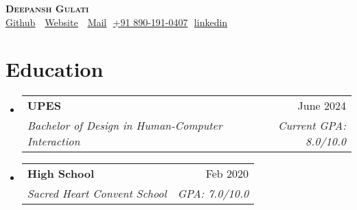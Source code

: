 \documentclass[letterpaper,11pt]{article}
\makeatletter
\newcommand{\resumeSubheading}[4]{
  \vspace{-2pt}\item
    \begin{tabular*}{0.97\textwidth}[t]{l@{\extracolsep{\fill}}r}
      \textbf{#1} & #2 \\
      \textit{\small#3} & \textit{\small #4} \\
    \end{tabular*}\vspace{-7pt}
}
\newcommand{\resumeSubHeadingListStart}{\begin{itemize}[leftmargin=0.15in, label={}]}
\newcommand{\resumeSubHeadingListEnd}{\end{itemize}}
\makeatother
\begin{document}
\begin{flushright}
  \vspace{-4pt}
\end{flushright}

\vspace{-7pt}

\begin{center}
    \textbf{\Huge \scshape Deepansh Gulati} \\ \vspace{8pt}
    \small 
    \faGithub
    \href{https://github.com/NeuralWordsmith}{\underline{Github}} $  $
    \faCode $  $
    \href{https://neuralwordsmith.github.io/}
    {\underline{Website}} $  $
    \faEnvelope$  $
    \href{mailto:deepictd@icloud.com}
    {\underline{Mail}}
    \faPhone$  $
    \underline{+91 890-191-0407}
    \faLinkedin$  $
    \href{https://linkedin.com/in/deepictd}{\underline{linkedin}} $  $
\end{center}

\section{Education}
  \resumeSubHeadingListStart
  
    \resumeSubheading
      {UPES}{June 2024}
      {Bachelor of Design in Human-Computer Interaction}{Current GPA: 8.0/10.0}
      
    \resumeSubheading
      {High School \footnotesize}{Feb 2020}
      {Sacred Heart Convent School}{GPA: 7.0/10.0}

  \resumeSubHeadingListEnd

\end{document}
